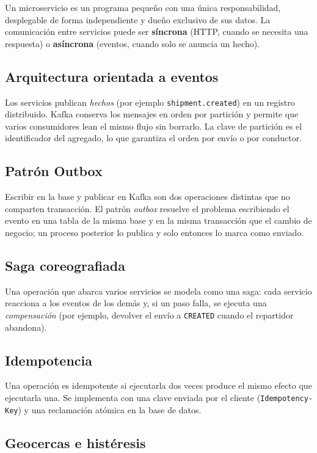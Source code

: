 \documentclass[conference]{IEEEtran}
\newcommand{\pkg}[1]{\texttt{#1}}
\begin{document}
Un microservicio es un programa pequeño con una única responsabilidad, desplegable de forma
independiente y dueño exclusivo de sus datos. La comunicación entre servicios puede ser
\textbf{síncrona} (HTTP, cuando se necesita una respuesta) o \textbf{asíncrona} (eventos, cuando
solo se anuncia un hecho).

\subsection{Arquitectura orientada a eventos}

Los servicios publican \emph{hechos} (por ejemplo \pkg{shipment.created}) en un registro
distribuido. Kafka conserva los mensajes en orden por partición y permite que varios consumidores
lean el mismo flujo sin borrarlo. La clave de partición es el identificador del agregado, lo que
garantiza el orden por envío o por conductor.

\subsection{Patrón Outbox}

Escribir en la base y publicar en Kafka son dos operaciones distintas que no comparten
transacción. El patrón \emph{outbox} resuelve el problema escribiendo el evento en una tabla de
la misma base y en la misma transacción que el cambio de negocio; un proceso posterior lo publica
y solo entonces lo marca como enviado.

\subsection{Saga coreografiada}

Una operación que abarca varios servicios se modela como una saga: cada servicio reacciona a los
eventos de los demás y, si un paso falla, se ejecuta una \emph{compensación} (por ejemplo,
devolver el envío a \texttt{CREATED} cuando el repartidor abandona).

\subsection{Idempotencia}

Una operación es idempotente si ejecutarla dos veces produce el mismo efecto que ejecutarla una.
Se implementa con una clave enviada por el cliente (\pkg{Idempotency-Key}) y una reclamación
atómica en la base de datos.

\subsection{Geocercas e histéresis}
\end{document}
